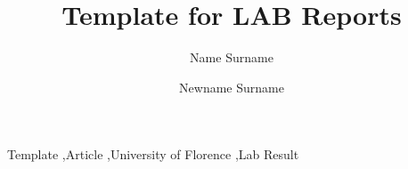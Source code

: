 \begin{frontmatter}

    \title{Template for LAB Reports}
    
    \author[inst1]{Name Surname}
        
    \author[inst2]{Newname Surname}


    \begin{abstract}
        \lipsum[1]
    \end{abstract}
    
    \begin{keyword}
        Template \sep Article \sep University of Florence \sep Lab Result  
    \end{keyword}

\end{frontmatter}
